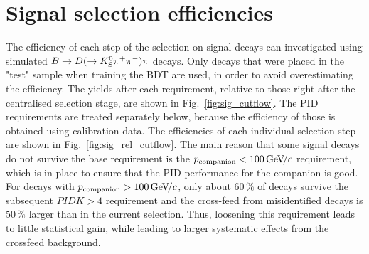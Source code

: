 

\section{Signal selection efficiencies} %
\label{sec:signal_selection_efficiencies}




The efficiency of each step of the selection on signal decays can investigated using simulated ${B}\rightarrow{\ensuremath{D}}(\rightarrow{\ensuremath{{K}^0_{\mathrm{S}}}}{\ensuremath{{\pi}^+}}{\ensuremath{{\pi}^-}})\pi$ decays. Only decays that were placed in the "test" sample when training the BDT are used, in order to avoid overestimating the efficiency. The yields after each requirement, relative to those right after the centralised selection stage, are shown in Fig.~\ref{fig:sig_cutflow}. The PID requirements are treated separately below, because the efficiency of those is obtained using calibration data. The efficiencies of each individual selection step are shown in Fig.~\ref{fig:sig_rel_cutflow}. The main reason that some signal decays do not survive the base requirement is the ${p_\mathrm{companion}<100\text{\,Ge\kern -0.1em V\!/}c}$ requirement, which is in place to ensure that the PID performance for the companion is good. For decays with $p_\mathrm{companion}>100\text{\,Ge\kern -0.1em V\!/}c$, only about $60\,\%$ of \BtoDK decays survive the subsequent $PIDK>4$ requirement and the cross-feed from misidentified \BtoDpi decays is $50\,\%$ larger than in the current selection. Thus, loosening this requirement leads to little statistical gain, while leading to larger systematic effects from the crossfeed background.

